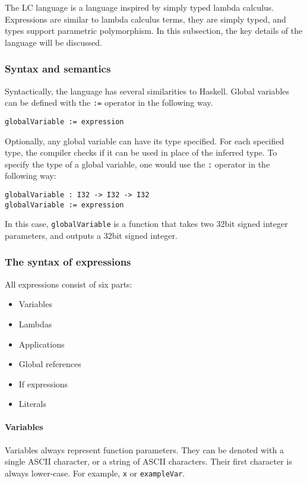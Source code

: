 \documentclass[12pt]{article}
\begin{document}
The LC language is a language inspired by simply typed lambda calculus.
Expressions are similar to lambda calculus terms, they are simply typed, and
types support parametric polymorphism. In this subsection, the key details of
the language will be discussed.

\subsubsection{Syntax and semantics}

Syntactically, the language has several similarities to Haskell. Global
variables can be defined with the \texttt{:=} operator in the following way.
\begin{lstlisting}
globalVariable := expression
\end{lstlisting}
Optionally, any global variable can have its type specified. For each specified
type, the compiler checks if it can be used in place of the inferred type. To
specify the type of a global variable, one would use the \texttt{:} operator in
the following way:
\begin{lstlisting}
globalVariable : I32 -> I32 -> I32
globalVariable := expression
\end{lstlisting}
In this case, \verb$globalVariable$ is a function that takes two 32bit signed
integer parameters, and outputs a 32bit signed integer.

\subsubsection{The syntax of expressions}

All expressions consist of six parts:
\begin{itemize}
    \item Variables
    \item Lambdas
    \item Applications
    \item Global references
    \item If expressions
    \item Literals
\end{itemize}

\paragraph{Variables} Variables always represent function parameters. They can
be denoted with a single ASCII character, or a string of ASCII characters. Their
first character is always lower-case. For example, \verb$x$ or \verb$exampleVar$.
\end{document}
